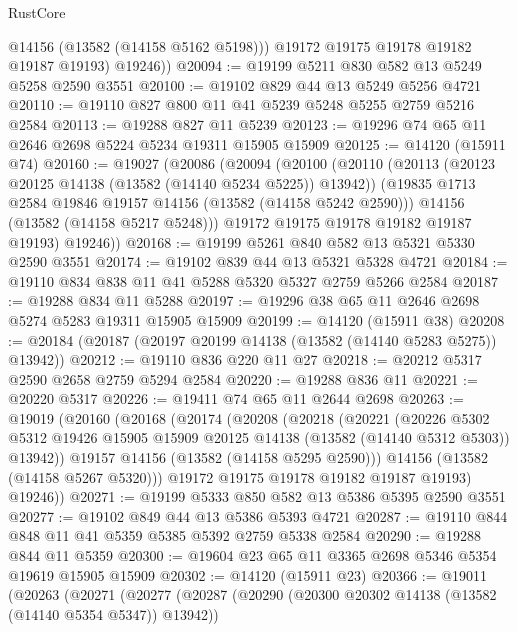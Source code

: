 \begin{lexlean}{RustCore}
\begin{coremodule}
            @14156
            (@13582 (@14158 @5162 @5198)))
          @19172
          @19175
          @19178
          @19182
          @19187
          @19193)
        @19246))
@20094 := @19199 @5211 @830 @582 @13 @5249 @5258 @2590 @3551
@20100 := @19102 @829 @44 @13 @5249 @5256 @4721
@20110 := @19110 @827 @800 @11 @41 @5239 @5248 @5255 @2759 @5216 @2584
@20113 := @19288 @827 @11 @5239
@20123 := @19296 @74 @65 @11 @2646 @2698 @5224 @5234 @19311 @15905 @15909
@20125 := @14120 (@15911 @74)
@20160 := @19027
    (@20086
      (@20094
        (@20100
          (@20110
            (@20113 (@20123 @20125 @14138 (@13582 (@14140 @5234 @5225)) @13942))
            (@19835 @1713 @2584 @19846 @19157 @14156 (@13582 (@14158 @5242 @2590)))
            @14156
            (@13582 (@14158 @5217 @5248)))
          @19172
          @19175
          @19178
          @19182
          @19187
          @19193)
        @19246))
@20168 := @19199 @5261 @840 @582 @13 @5321 @5330 @2590 @3551
@20174 := @19102 @839 @44 @13 @5321 @5328 @4721
@20184 := @19110 @834 @838 @11 @41 @5288 @5320 @5327 @2759 @5266 @2584
@20187 := @19288 @834 @11 @5288
@20197 := @19296 @38 @65 @11 @2646 @2698 @5274 @5283 @19311 @15905 @15909
@20199 := @14120 (@15911 @38)
@20208 := @20184 (@20187 (@20197 @20199 @14138 (@13582 (@14140 @5283 @5275)) @13942))
@20212 := @19110 @836 @220 @11 @27
@20218 := @20212 @5317 @2590 @2658 @2759 @5294 @2584
@20220 := @19288 @836 @11
@20221 := @20220 @5317
@20226 := @19411 @74 @65 @11 @2644 @2698
@20263 := @19019
    (@20160
      (@20168
        (@20174
          (@20208
            (@20218
              (@20221
                (@20226
                  @5302
                  @5312
                  @19426
                  @15905
                  @15909
                  @20125
                  @14138
                  (@13582 (@14140 @5312 @5303))
                  @13942))
              @19157
              @14156
              (@13582 (@14158 @5295 @2590)))
            @14156
            (@13582 (@14158 @5267 @5320)))
          @19172
          @19175
          @19178
          @19182
          @19187
          @19193)
        @19246))
@20271 := @19199 @5333 @850 @582 @13 @5386 @5395 @2590 @3551
@20277 := @19102 @849 @44 @13 @5386 @5393 @4721
@20287 := @19110 @844 @848 @11 @41 @5359 @5385 @5392 @2759 @5338 @2584
@20290 := @19288 @844 @11 @5359
@20300 := @19604 @23 @65 @11 @3365 @2698 @5346 @5354 @19619 @15905 @15909
@20302 := @14120 (@15911 @23)
@20366 := @19011
    (@20263
      (@20271
        (@20277
          (@20287
            (@20290 (@20300 @20302 @14138 (@13582 (@14140 @5354 @5347)) @13942))

\end{coremodule}
\end{lexlean}
